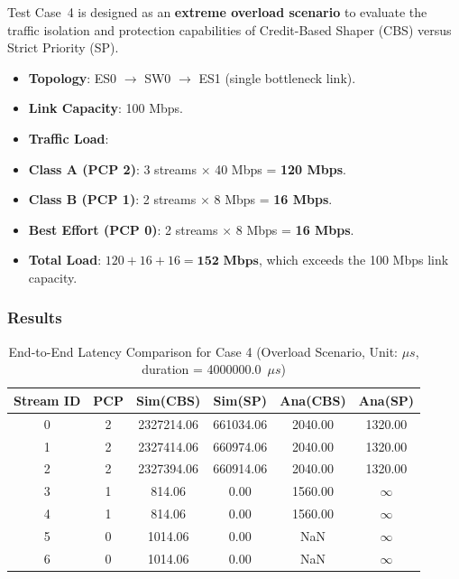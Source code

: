 Test Case~4 is designed as an \textbf{extreme overload scenario} to evaluate the traffic isolation and protection capabilities of Credit-Based Shaper (CBS) versus Strict Priority (SP).

\begin{itemize}
    \item \textbf{Topology}: ES0 $\rightarrow$ SW0 $\rightarrow$ ES1 (single bottleneck link).
    \item \textbf{Link Capacity}: 100 Mbps.
    \item \textbf{Traffic Load}:
\item \textbf{Class A (PCP 2)}: 3 streams $\times$ 40 Mbps = \textbf{120 Mbps}.
\item \textbf{Class B (PCP 1)}: 2 streams $\times$ 8 Mbps = \textbf{16 Mbps}.
\item \textbf{Best Effort (PCP 0)}: 2 streams $\times$ 8 Mbps = \textbf{16 Mbps}.
\item \textbf{Total Load}: $120 + 16 + 16 = \mathbf{152 \text{ Mbps}}$, which exceeds the 100 Mbps link capacity.
\end{itemize}

\subsubsection{Results}

\begin{table}[H]
    \centering
    \caption{End-to-End Latency Comparison for Case 4 (Overload Scenario, Unit: $\mu s$, duration = 4000000.0~$\mu s$)}
    \label{tab:case4}
    \begin{tabular}{cccccc}
        \toprule
        \textbf{Stream ID} & \textbf{PCP} & \textbf{Sim(CBS)} & \textbf{Sim(SP)} & \textbf{Ana(CBS)} & \textbf{Ana(SP)} \\
        \midrule
        0 & 2 & 2327214.06 & 661034.06 & 2040.00 & 1320.00 \\
        1 & 2 & 2327414.06 & 660974.06 & 2040.00 & 1320.00 \\
        2 & 2 & 2327394.06 & 660914.06 & 2040.00 & 1320.00 \\
        \midrule
        3 & 1 & 814.06 & 0.00 & 1560.00 & $\infty$ \\
        4 & 1 & 814.06 & 0.00 & 1560.00 & $\infty$ \\
        \midrule
        5 & 0 & 1014.06 & 0.00 & NaN & $\infty$ \\
        6 & 0 & 1014.06 & 0.00 & NaN & $\infty$ \\
        \bottomrule
    \end{tabular}
\end{table}

